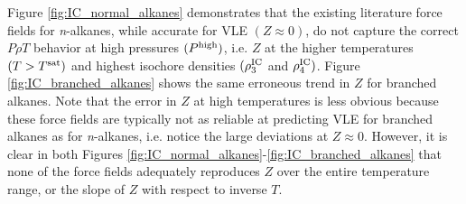 \documentclass[preprint,letterpaper,floatfix,citeautoscript,aip,jcp]{revtex4-1}
\begin{document}
Figure \ref{fig:IC_normal_alkanes} demonstrates that the existing literature force fields for \textit{n}-alkanes, while accurate for VLE $(Z \approx 0)$, do not capture the correct $P \rho T$ behavior at high pressures $(P^{\rm high})$, i.e. $Z$ at the higher temperatures $(T > T^{\rm sat})$ and highest isochore densities $(\rho^{\rm IC}_3$ and $\rho^{\rm IC}_4)$. 
Figure \ref{fig:IC_branched_alkanes} shows the same erroneous trend in $Z$ for branched alkanes. Note that the error in $Z$ at high temperatures is less obvious because these force fields are typically not as reliable at predicting VLE for branched alkanes as for \textit{n}-alkanes, i.e. notice the large deviations at $Z \approx 0$. 
However, it is clear in both Figures \ref{fig:IC_normal_alkanes}-\ref{fig:IC_branched_alkanes} that none of the force fields adequately reproduces $Z$ over the entire temperature range, or the slope of $Z$ with respect to inverse $T$.



\end{document}
